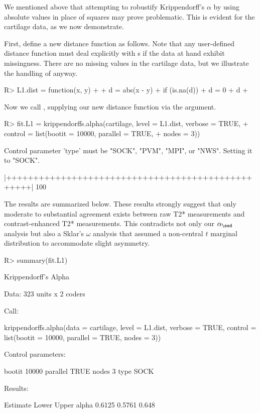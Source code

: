 We mentioned above that attempting to robustify Krippendorff's $\alpha$ by using absolute values in place of squares may prove problematic. This is evident for the cartilage data, as we now demonstrate.

First, define a new distance function as follows. Note that any user-defined distance function must deal explicitly with s if the data at hand exhibit missingness. There are no missing values in the cartilage data, but we illustrate the handling of  anyway.

\begin{example}
R> L1.dist = function(x, y)
+ {
+    d = abs(x - y)
+    if (is.na(d))
+        d = 0
+    d
+ }
\end{example}

Now we call , supplying our new distance function via the  argument.

\begin{example}
R> fit.L1 = krippendorffs.alpha(cartilage, level = L1.dist, verbose = TRUE,
+                               control = list(bootit = 10000, parallel = TRUE,
+                               nodes = 3))

Control parameter 'type' must be "SOCK", "PVM", "MPI", or "NWS". Setting it to "SOCK".

  |++++++++++++++++++++++++++++++++++++++++++++++++++| 100%
\end{example}

The results are summarized below. These results strongly suggest that only moderate to substantial agreement exists between raw T2* measurements and contrast-enhanced T2* measurements. This contradicts not only our $\alpha_\sed$ analysis but also a Sklar's $\omega$ analysis that assumed a non-central $t$ marginal distribution to accommodate slight asymmetry.

\begin{example}
R> summary(fit.L1)

Krippendorff's Alpha

Data: 323 units x 2 coders

Call:

krippendorffs.alpha(data = cartilage, level = L1.dist, verbose = TRUE, 
    control = list(bootit = 10000, parallel = TRUE, nodes = 3))

Control parameters:
              
bootit   10000
parallel TRUE 
nodes    3    
type     SOCK 
              
Results:

      Estimate  Lower Upper
alpha   0.6125 0.5761 0.648
\end{example}

